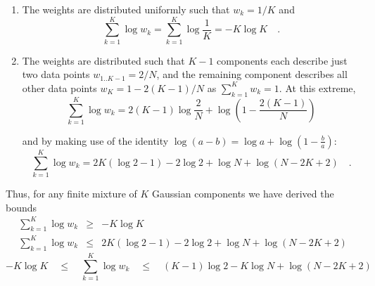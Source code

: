 \documentclass{elsarticle}
\def\weight{w}
\begin{document}
\begin{enumerate}
    \item The weights are distributed uniformly such that $w_k = 1/K$ and
          \begin{equation}
                \sum_{k=1}^{K}\log\weight_k = \sum_{k=1}^{K}\log{\frac{1}{K}} =-K\log{K} \quad .
          \end{equation}
    \item The weights are distributed such that $K - 1$ components each 
          describe just two data points $w_{1..K-1} = 2/N$, and the remaining 
          component describes all other data points $w_{K} = 1 - 2(K-1)/N$
          as $\sum_{k=1}^{K}\weight_k = 1$. At this extreme,
          \begin{equation}
                \sum_{k=1}^{K}\log\weight_k = 2(K-1)\log\frac{2}{N} 
                		    + \log\left(1 - \frac{2(K - 1)}{N}\right)
          \end{equation}

          \noindent{}and by making use of the identity 
            $\log{(a-b)} = \log{a} + \log{(1 - \frac{b}{a})}$:
          \begin{equation}
                \sum_{k=1}^{K}\log\weight_k = 2K\left(\log{2} - 1\right) - 2\log{2} + \log{N} + \log{\left(N - 2K + 2\right)} \quad .
          \end{equation}
\end{enumerate}

\noindent{}Thus, for any finite mixture of $K$ Gaussian components we have 
derived the bounds
\begin{eqnarray}
\sum_{k=1}^{K}\log\weight_k & \geq & -K\log{K} \nonumber \\
\sum_{k=1}^{K}\log\weight_k & \leq & 2K\left(\log{2} - 1\right) - 2\log{2} + \log{N} + \log{\left(N - 2K + 2\right)} \nonumber
\end{eqnarray}
\begin{equation}
-K\log{K} \quad \leq \quad \sum_{k=1}^{K}\log\weight_k \quad \leq \quad (K - 1)\log{2} - K\log{N} + \log{(N - 2K + 2)}
\end{equation}
\end{document}
